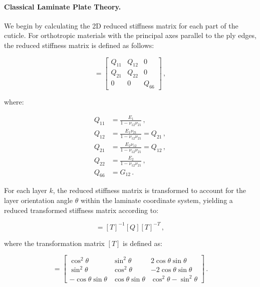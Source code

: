 \documentclass[twocolumn, linenumbers, superscriptaddress, nofootinbib]{revtex4-1}
\begin{document}
			\paragraph*{Classical Laminate Plate Theory.}
				We begin by calculating the 2D reduced stiffness matrix for each part of the cuticle.
				For orthotropic materials with the principal axes parallel to the ply edges, the reduced stiffness matrix is defined as follows:
				
				\begin{equation}
				[Q] =
					\begin{bmatrix}
						Q_{11} & Q_{12} & 0 \\
						Q_{21} & Q_{22} & 0 \\
						0 & 0 & Q_{66}
					\end{bmatrix}\,,
				\end{equation}
				
				where:
				
				\begin{equation}
				\begin{aligned}
					Q_{11} & = \frac{E_{1}}{1 - \nu_{12}\nu_{21}}\,, \\
					Q_{12} & = \frac{E_{1}\nu_{21}}{1 - \nu_{12}\nu_{21}} = Q_{21}\,, \\
					Q_{21} & = \frac{E_{2}\nu_{12}}{1 - \nu_{12}\nu_{21}} = Q_{12}\,, \\
					Q_{22} & = \frac{E_{2}}{1 - \nu_{12}\nu_{21}}\,, \\
					Q_{66} & = G_{12}\,.
				\end{aligned}
				\end{equation}
				
				For each layer $k$, the reduced stiffness matrix is transformed to account for the layer orientation angle $\theta$ within the laminate coordinate system, yielding a reduced transformed stiffness matrix according to:
				
				\begin{equation}
					[\bar{Q}] = [T]^{-1}[Q][T]^{-T}\,,
				\end{equation}
				
				where the transformation matrix $[T]$ is defined as:
				
				\begin{equation}
				[T] =
				 \begin{bmatrix}
					 \cos^2\theta & \sin^2\theta & 2\cos\theta\sin\theta \\
					 \sin^2\theta & \cos^2\theta & -2\cos\theta\sin\theta \\
					 -\cos\theta\sin\theta & \cos\theta\sin\theta & \cos^2\theta - \sin^2\theta
				 \end{bmatrix}\,.
				\end{equation}
				
\end{document}

